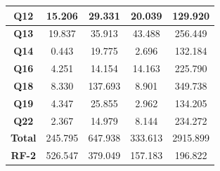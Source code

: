 \begin{table}[htpb]
\begin{tabular}{|c|c|c|c|c|}
                 \textbf{Q12}         & 15.206            & 29.331                        & 20.039            & 129.920                   \\ 
                \hline
                 \textbf{Q13}         & 19.837            & 35.913                        & 43.488            & 256.449                   \\ 
                \hline
                 \textbf{Q14}         & 0.443             & 19.775                        & 2.696             & 132.184                   \\ 
                \hline
                 \textbf{Q16}         & 4.251             & 14.154                        & 14.163            & 225.790                   \\ 
                \hline
                 \textbf{Q18}         & 8.330             & 137.693                       & 8.901             & 349.738                   \\ 
                \hline
                 \textbf{Q19}         & 4.347             & 25.855                        & 2.962             & 134.205                   \\ 
                \hline
                 \textbf{Q22}         & 2.367             & 14.979                        & 8.144             & 234.272                   \\ 
                \hline
                 \textbf{Total}       & 245.795           & 647.938                       & 333.613           & 2915.899                  \\ 
                \hline
                 \textbf{RF-2}        & 526.547           & 379.049                       & 157.183           & 196.822                   \\
                \hline
                \end{tabular}
                \end{table}

